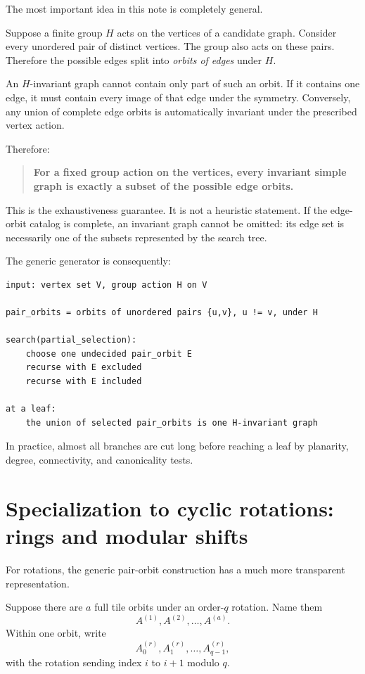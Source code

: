 \documentclass[11pt]{article}
\begin{document}
The most important idea in this note is completely general.

Suppose a finite group \(H\) acts on the vertices of a candidate graph. Consider every unordered pair of distinct vertices. The group also acts on these pairs. Therefore the possible edges split into \emph{orbits of edges} under \(H\).

An \(H\)-invariant graph cannot contain only part of such an orbit. If it contains one edge, it must contain every image of that edge under the symmetry. Conversely, any union of complete edge orbits is automatically invariant under the prescribed vertex action.

Therefore:

\begin{quote}
\textbf{For a fixed group action on the vertices, every invariant simple graph is exactly a subset of the possible edge orbits.}
\end{quote}

This is the exhaustiveness guarantee. It is not a heuristic statement. If the edge-orbit catalog is complete, an invariant graph cannot be omitted: its edge set is necessarily one of the subsets represented by the search tree.

The generic generator is consequently:

\begin{lstlisting}
input: vertex set V, group action H on V

pair_orbits = orbits of unordered pairs {u,v}, u != v, under H

search(partial_selection):
    choose one undecided pair_orbit E
    recurse with E excluded
    recurse with E included

at a leaf:
    the union of selected pair_orbits is one H-invariant graph
\end{lstlisting}

In practice, almost all branches are cut long before reaching a leaf by planarity, degree, connectivity, and canonicality tests.

\section{Specialization to cyclic rotations: rings and modular shifts}

For rotations, the generic pair-orbit construction has a much more transparent representation.

Suppose there are \(a\) full tile orbits under an order-\(q\) rotation. Name them
\[
A^{(1)}, A^{(2)}, \ldots, A^{(a)}.
\]
Within one orbit, write
\[
A^{(r)}_0,A^{(r)}_1,\ldots,A^{(r)}_{q-1},
\]
with the rotation sending index \(i\) to \(i+1\) modulo \(q\).
\end{document}
